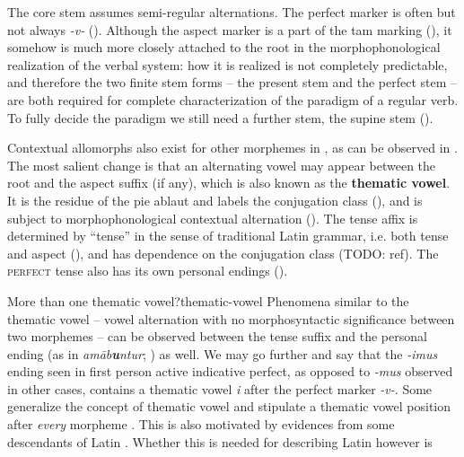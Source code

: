 \documentclass[a4paper, oneside, 12pt]{report}
\newcommand*{\citepage}[1]{p.~{#1}}
\newcommand*{\concept}[1]{\textbf{#1}}
\newcommand{\form}[1]{\emph{#1}}
\newcommand*{\category}[1]{\textsc{#1}}
\begin{document}
The core stem assumes semi-regular alternations.
The perfect marker is often but not always \form{-v-} ().
Although the aspect marker is a part of the \acs{tam} marking
(),
it somehow is much more closely attached to the root 
in the morphophonological realization of the verbal system:
how it is realized is not completely predictable,
and therefore the two finite stem forms -- 
the present stem and the perfect stem -- 
are both required for complete characterization of the paradigm of a regular verb.
To fully decide the paradigm 
we still need a further stem, the supine stem
().

Contextual allomorphs also exist for other morphemes in 
\citep[\citepage{11}]{embick2005status},
as can be observed in .
The most salient change is that 
an alternating vowel may appear between the root and the aspect suffix (if any),
which is also known as the \concept{thematic vowel}.
It is the residue of the \ac{pie} ablaut
and labels the conjugation class
(),
and is subject to morphophonological contextual alternation
().
The tense affix is determined by ``tense'' in the sense of traditional Latin grammar, 
i.e. both tense and aspect (),
and has dependence on the conjugation class (TODO: ref).
The \category{perfect} tense also has its own personal endings ().

\begin{infobox}{More than one thematic vowel?}{thematic-vowel}
    Phenomena similar to the thematic vowel -- vowel alternation with no morphosyntactic significance 
    between two morphemes -- can be observed 
    between the tense suffix and the personal ending 
    (as in \form{am\={a}b\textbf{u}ntur}; ) as well.
    We may go further and say that
    the \form{-imus} ending seen in first person active indicative perfect,
    as opposed to \form{-mus} observed in other cases, 
    contains a thematic vowel \form{i} after the perfect marker \form{-v-}.
    Some generalize the concept of thematic vowel and 
    stipulate a thematic vowel position after \emph{every} morpheme
    \cite{embick2003latin}.
    This is also motivated by evidences from some descendants of Latin 
    \citep{oltra1999notion,oltra2005stress}.
    Whether this is needed for describing Latin however is 
\end{infobox}
\end{document}
